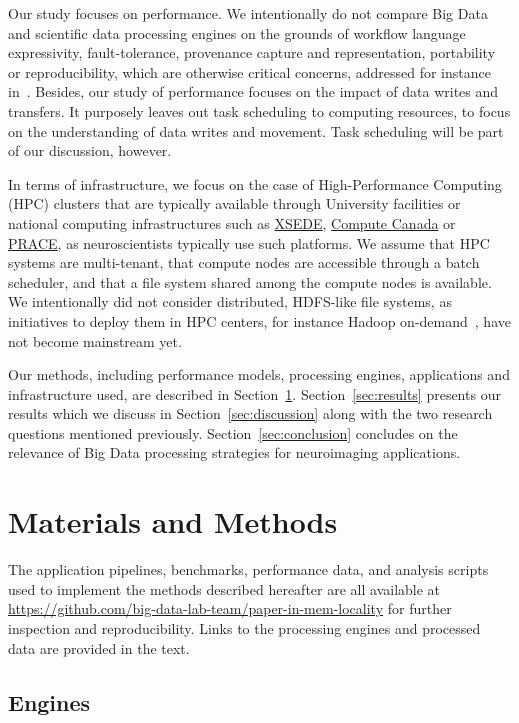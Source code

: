 Our study focuses on performance. We intentionally do not 
compare Big Data and scientific data processing engines on the grounds 
of workflow language expressivity, fault-tolerance, provenance capture 
and representation, portability or reproducibility, which are otherwise 
critical concerns, addressed for instance in~\cite{samba}. Besides, our 
study of performance focuses on the impact of data writes and 
transfers. It purposely leaves out task scheduling to computing 
resources, to focus on the understanding of 
data writes and movement. Task scheduling will be part of our 
discussion, however.

In terms of infrastructure, we focus on the case of High-Performance Computing 
(HPC) clusters that are typically available through University 
facilities or national computing infrastructures such as 
\href{xsede.org}{XSEDE}, \href{http://computecanada.ca}{Compute Canada} 
or \href{http://www.prace-ri.eu}{PRACE}, as neuroscientists typically use such platforms.
 We assume that HPC systems are 
multi-tenant, that compute nodes are accessible through a batch 
scheduler, and that a file system shared among the compute nodes is 
available. We intentionally did not consider distributed, 
HDFS-like file systems, as initiatives to deploy them in HPC 
centers, for instance Hadoop on-demand~\cite{krishnan2011myhadoop}, have not 
become mainstream yet.

Our methods, including performance models, processing engines, 
applications and infrastructure used, are described in 
Section~\ref{sec:methods}. Section~\ref{sec:results} presents our 
results which we discuss in Section~\ref{sec:discussion} along with the 
two research questions mentioned previously. 
Section~\ref{sec:conclusion} concludes on the relevance of Big Data 
processing strategies for neuroimaging applications.

\section{Materials and Methods} %
\label{sec:methods}

The application pipelines, benchmarks, performance data, and analysis scripts used 
to implement the methods described hereafter are all available at 
\url{https://github.com/big-data-lab-team/paper-in-mem-locality} for 
further inspection and reproducibility. Links to the processing engines 
and processed data are provided in the text.

\subsection{Engines} %


